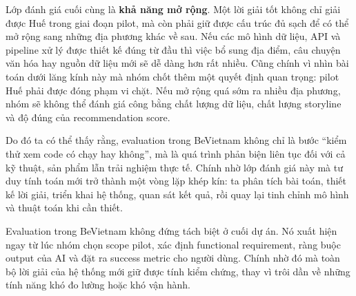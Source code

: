 Lớp đánh giá cuối cùng là \textbf{khả năng mở rộng}. Một lời giải tốt
không chỉ giải được Huế trong giai đoạn pilot, mà còn phải giữ được cấu
trúc đủ sạch để có thể mở rộng sang những địa phương khác về sau. Nếu
các mô hình dữ liệu, API và pipeline xử lý được thiết kế đúng từ đầu thì
việc bổ sung địa điểm, câu chuyện văn hóa hay nguồn dữ liệu mới sẽ dễ
dàng hơn rất nhiều. Cũng chính vì nhìn bài toán dưới lăng kính này mà
nhóm chốt thêm một quyết định quan trọng: pilot Huế phải được đóng phạm
vi chặt. Nếu mở rộng quá sớm ra nhiều địa phương, nhóm sẽ không thể đánh
giá công bằng chất lượng dữ liệu, chất lượng storyline và độ đúng của
recommendation score.

Do đó ta có thể thấy rằng, evaluation trong BeVietnam không chỉ là bước
``kiểm thử xem code có chạy hay không'', mà là quá trình phản biện liên
tục đối với cả kỹ thuật, sản phẩm lẫn trải nghiệm thực tế. Chính nhờ lớp
đánh giá này mà tư duy tính toán mới trở thành một vòng lặp khép kín: ta
phân tích bài toán, thiết kế lời giải, triển khai hệ thống, quan sát kết
quả, rồi quay lại tinh chỉnh mô hình và thuật toán khi cần thiết.

\begin{note}
Evaluation trong BeVietnam không đứng tách biệt ở cuối dự án. Nó xuất
hiện ngay từ lúc nhóm chọn scope pilot, xác định functional requirement,
ràng buộc output của AI và đặt ra success metric cho người dùng. Chính
nhờ đó mà toàn bộ lời giải của hệ thống mới giữ được tính kiểm chứng,
thay vì trôi dần về những tính năng khó đo lường hoặc khó vận hành.
\end{note}
